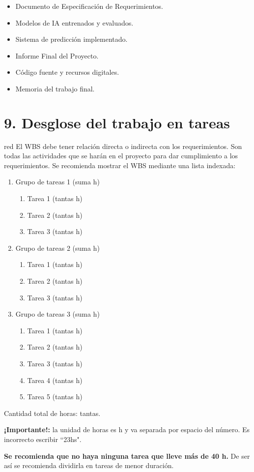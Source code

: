 \documentclass[
11pt, %
codirector, %
]{charter}
\begin{document}
\begin{itemize}
	\item Documento de Especificación de Requerimientos.
	\item Modelos de IA entrenados y evaluados.
	\item Sistema de predicción implementado.
	\item Informe Final del Proyecto.
	\item Código fuente y recursos digitales.
	\item Memoria del trabajo final.
\end{itemize}

\section{9. Desglose del trabajo en tareas}
\label{sec:wbs}

\begin{consigna}{red}
El WBS debe tener relación directa o indirecta con los requerimientos.  Son todas las actividades que se harán en el proyecto para dar cumplimiento a los requerimientos. Se recomienda mostrar el WBS mediante una lista indexada:

\begin{enumerate}
\item Grupo de tareas 1 (suma h)
	\begin{enumerate}
	\item Tarea 1 (tantas h)
	\item Tarea 2 (tantas h)
	\item Tarea 3 (tantas h)
	\end{enumerate}
\item Grupo de tareas 2 (suma h)
	\begin{enumerate}
	\item Tarea 1 (tantas h)
	\item Tarea 2 (tantas h)
	\item Tarea 3 (tantas h)
	\end{enumerate}
\item Grupo de tareas 3 (suma h)
	\begin{enumerate}
	\item Tarea 1 (tantas h)
	\item Tarea 2 (tantas h)
	\item Tarea 3 (tantas h)
	\item Tarea 4 (tantas h)
	\item Tarea 5 (tantas h)
	\end{enumerate}
\end{enumerate}

Cantidad total de horas: tantas.

\textbf{¡Importante!:} la unidad de horas es h y va separada por espacio del número. Es incorrecto escribir ``23hs".

\textbf{Se recomienda que no haya ninguna tarea que lleve más de 40 h.} De ser así se recomienda dividirla en tareas de menor duración.

\end{consigna}
\end{document}
